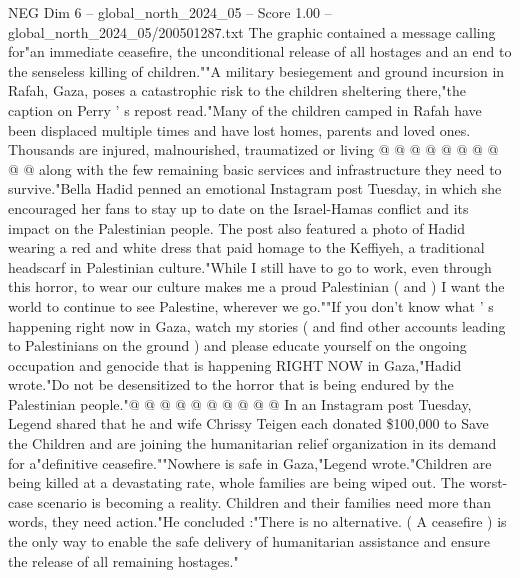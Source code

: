 \begin{textsample}{NEG Dim 6 – global\_north\_2024\_05 – Score 1.00 – global\_north\_2024\_05/200501287.txt}
The graphic contained a message calling for"an immediate ceasefire, the unconditional release of all hostages and an end to the senseless killing of children.""A military besiegement and ground incursion in Rafah, Gaza, poses a catastrophic risk to the children sheltering there,"the caption on Perry ' s repost read."Many of the children camped in Rafah have been displaced multiple times and have lost homes, parents and loved ones.
Thousands are injured, malnourished, traumatized or living @ @ @ @ @ @ @ @ @ @ along with the few remaining basic services and infrastructure they need to survive."Bella Hadid penned an emotional Instagram post Tuesday, in which she encouraged her fans to stay up to date on the Israel-Hamas conflict and its impact on the Palestinian people.
The post also featured a photo of Hadid wearing a red and white dress that paid homage to the Keffiyeh, a traditional headscarf in Palestinian culture."While I still have to go to work, even through this horror, to wear our culture makes me a proud Palestinian ( and ) I want the world to continue to see Palestine, wherever we go.""If you don't know what ' s happening right now in Gaza, watch my stories ( and find other accounts leading to Palestinians on the ground ) and please educate yourself on the ongoing occupation and genocide that is happening RIGHT NOW in Gaza,"Hadid wrote."Do not be desensitized to the horror that is being endured by the Palestinian people."@ @ @ @ @ @ @ @ @ @ In an Instagram post Tuesday, Legend shared that he and wife Chrissy Teigen each donated \$100,000 to Save the Children and are joining the humanitarian relief organization in its demand for a"definitive ceasefire.""Nowhere is safe in Gaza,"Legend wrote."Children are being killed at a devastating rate, whole families are being wiped out.
The worst-case scenario is becoming a reality.
Children and their families need more than words, they need action."He concluded :"There is no alternative. ( A ceasefire ) is the only way to enable the safe delivery of humanitarian assistance and ensure the release of all remaining hostages."

\end{textsample}
